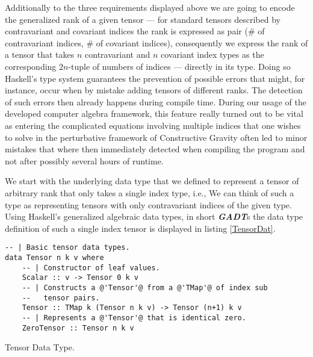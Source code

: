 Additionally to the three requirements displayed above we are going to encode the generalized rank of a given tensor --- for standard tensors described by contravariant and covariant indices the rank is expressed as pair ($\#$ of contravariant indices, $\#$ of covariant indices), consequently we express the rank of a tensor that takes $n$ contravariant and $n$ covariant index types as the corresponding $2n$-tuple of numbers of indices --- directly in its type. Doing so Haskell's type system guarantees the prevention of possible errors that might, for instance, occur when by mistake adding tensors of different ranks. The detection of such errors then already happens during compile time. During our usage of the developed computer algebra framework, this feature really turned out to be vital as entering the complicated equations involving multiple indices that one wishes to solve in the perturbative framework of Constructive Gravity often led to minor mistakes that where then immediately detected when compiling the program and not after possibly several hours of runtime.

We start with the underlying data type that we defined to represent a tensor of arbitrary rank that only takes a single index type, i.e., We can think of such a type as representing tensors with only contravariant indices of the given type. Using Haskell's generalized algebraic data types, in short \textit{\textbf{GADT}}s the data type definition of such a single index tensor is displayed in listing \ref{TensorDat}. 

\begin{listing}[hbt!]
\begin{verbatim}
-- | Basic tensor data types.
data Tensor n k v where
    -- | Constructor of leaf values.
    Scalar :: v -> Tensor 0 k v
    -- | Constructs a @'Tensor'@ from a @'TMap'@ of index sub
    --   tensor pairs.
    Tensor :: TMap k (Tensor n k v) -> Tensor (n+1) k v
    -- | Represents a @'Tensor'@ that is identical zero.
    ZeroTensor :: Tensor n k v
\end{verbatim} 
\caption{Tensor Data Type.}\label{TensorDat}
\end{listing}


